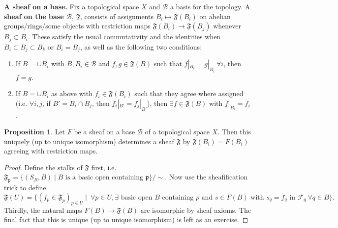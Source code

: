 \documentclass{article}
\theoremstyle{definition}
\newtheorem{prop}[theorem]{Proposition}
\begin{document}
\textbf{A sheaf on a base.} Fix a topological space $X$ and $\mathcal{B}$ a basis for the topology. A \textbf{sheaf on the base $\mathcal{B}$}, $\mathfrak{F}$, consists of assignments $B_i \mapsto \mathfrak{F}(B_i)$ on abelian groups/rings/some objects with restriction maps $\mathfrak{F}(B_i) \to \mathfrak{F}(B_j)$ whenever $B_j \subset B_i$. These satisfy the usual commutativity and the identities when $B_i \subset B_j \subset B_k$ or $B_i = B_j$, as well as the following two conditions:
\begin{enumerate}[(1)]
    \item If $B = \cup B_i$ with $B, B_i \in \mathcal{B}$ and $f, g \in \mathfrak{F}(B)$ such that $f|_{B_i} = g|_{B_i} ~\forall i$, then $f = g$. 
    \item If $B = \cup B_i$ as above with $f_i \in \mathfrak{F}(B_i)$ such that they agree where assigned (i.e. $\forall i,j$, if $B' = B_i \cap B_j$, then $f_i|_{B'} = f_j|_{B'}$), then $\exists f \in \mathfrak{F}(B)$ with $f|_{B_i} = f_i$.
\end{enumerate}
\begin{prop}
    Let $F$ be a sheaf on a base $\mathcal{B}$ of a topological space $X$. Then this uniquely (up to unique isomorphism) determines a sheaf $\mathfrak{F}$ by $\mathfrak{F}(B_i) = F(B_i)$ agreeing with restriction maps.
\end{prop}
\begin{proof}
    Define the stalks of $\mathfrak{F}$ first, i.e. $\mathfrak{F}_\mathfrak{p} = \{(S_B,B) \mid B \text{ is a basic open containing }\mathfrak{p}\}/\sim$. Now use the sheafification trick to define $$\mathfrak{F}(U) = \{(f_p \in \mathfrak{F}_p)_{p \in U} \mid ~\forall p \in U, \exists \text{ basic open }B \text{ containing }p \text{ and } s \in F(B) \text{ with }s_q = f_q \text{ in }\mathcal{F}_q ~\forall q \in B\}.$$
    Thirdly, the natural maps $F(B) \to \mathfrak{F}(B)$ are isomorphic by sheaf axioms. The final fact that this is unique (up to unique isomorphism) is left as an exercise.
\end{proof}
\end{document}
